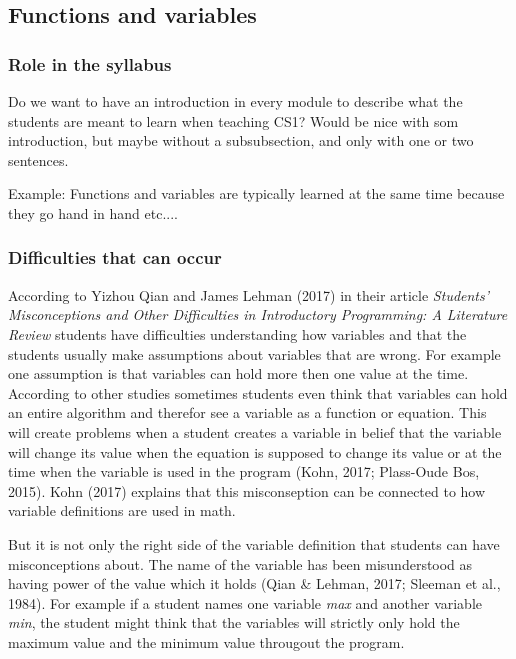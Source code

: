 \subsection{Functions and variables}

\subsubsection{Role in the syllabus}

Do we want to have an introduction in every module to describe what the students are meant to learn when teaching CS1? Would be nice with som introduction, but maybe without a subsubsection, and only with one or two sentences. 

Example: Functions and variables are typically learned at the same time because they go hand in hand etc....

\subsubsection{Difficulties that can occur}

According to Yizhou Qian and James Lehman (2017) in their article \emph{Students’ Misconceptions and Other Difficulties in Introductory Programming: A Literature Review} students have difficulties understanding how variables and that the students usually make assumptions about variables that are wrong. For example one assumption is that variables can hold more then one value at the time. According to other studies sometimes students even think that variables can hold an entire algorithm and therefor see a variable as a function or equation. This will create problems when a student creates a variable in belief that the variable will change its value when the equation is supposed to change its value or at the time when the variable is used in the program (Kohn, 2017; Plass-Oude Bos, 2015). Kohn (2017) explains that this misconseption can be connected to how variable definitions are used in math. 

But it is not only the right side of the variable definition that students can have misconceptions about. The name of the variable has been misunderstood as having power of the value which it holds (Qian \& Lehman, 2017; Sleeman et al., 1984). For example if a student names one variable \emph{max} and another variable \emph{min}, the student might think that the variables will strictly only hold the maximum value and the minimum value througout the program. 

